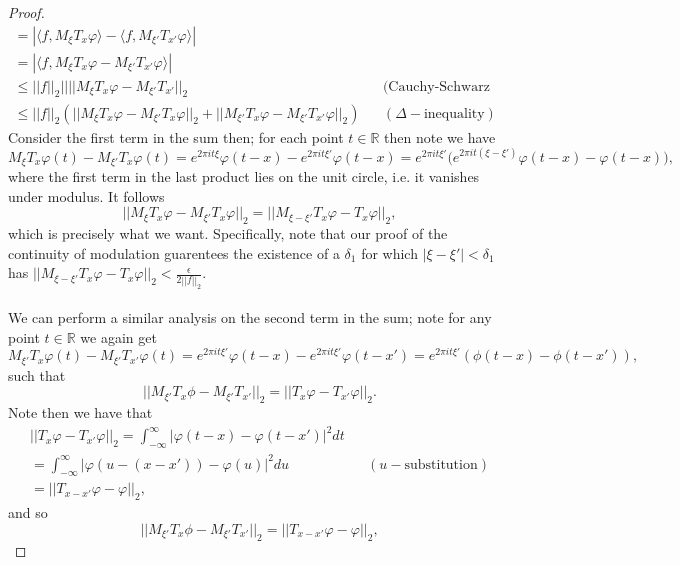 \documentclass[12pt]{article}
\newenvironment{ex}[2][Exercise]{\begin{trivlist}
\item[\hskip \labelsep {\bfseries #1}\hskip \labelsep {\bfseries #2.}]}{\end{trivlist}}
\begin{document}
\begin{ex}{16}
\begin{enumerate}[label=(\alph*)]
\begin{proof}
\begin{align*}
                = |\langle f, M_\xi T_x \varphi \rangle - \langle f, M_{\xi'} T_{x'} \varphi \rangle| \\
                = |\langle f, M_\xi T_x \varphi - M_{\xi'}T_{x'} \varphi \rangle| \\
                \leq ||f||_2||||M_\xi T_x \varphi - M_{\xi'}T_{x'}||_2 && \text{(Cauchy-Schwarz inequality)} \\
                \leq ||f||_2(||M_\xi T_x \varphi - M_{\xi'} T_{x} \varphi||_2 + ||M_{\xi'} T_{x}\varphi - M_{\xi'}T_{x'}\varphi||_2) && (\Delta-\text{inequality})
            \end{align*}
            Consider the first term in the sum then; for each point $t \in \mathbb{R}$ then note we have
            $$M_{\xi}T_{x}\varphi(t) - M_{\xi'}T_{x}\varphi(t) = e^{2\pi it\xi}\varphi(t - x) - e^{2 \pi it\xi'}\varphi(t - x) = e^{2\pi it\xi'} \Big (e^{2\pi i t (\xi - \xi')}\varphi(t - x) - \varphi(t - x) \Big),$$
            where the first term in the last product lies on the unit circle, i.e. it vanishes under modulus. It follows
            $$||M_\xi T_x \varphi - M_{\xi'} T_{x} \varphi||_2 = ||M_{\xi - \xi'}T_x\varphi - T_x\varphi||_2,$$
            which is precisely what we want. Specifically, note that our proof of the continuity of modulation guarentees the existence of a $\delta_1$ for which $|\xi - \xi'| < \delta_1$ has $||M_{\xi - \xi'}T_x\varphi - T_x\varphi||_2 < \frac{\epsilon}{2||f||_2}$. \\ \\
            We can perform a similar analysis on the second term in the sum; note for any point $t \in \mathbb{R}$ we again get
            $$M_{\xi'}T_x\varphi(t) - M_{\xi'}T_{x'}\varphi(t) = e^{2\pi it\xi'}\varphi(t - x) - e^{2\pi it\xi'}\varphi(t - x') = e^{2\pi it\xi'}(\phi(t - x) - \phi(t - x')),$$
            such that 
            $$||M_{\xi'}T_x\phi - M_{\xi'}T_{x'}||_2 = ||T_x\varphi - T_{x'}\varphi||_2.$$
            Note then we have that 
            \begin{align*}
                ||T_x\varphi - T_{x'}\varphi||_2 = \int_{-\infty}^\infty |\varphi(t - x) - \varphi(t - x')|^2 dt \\
                = \int_{-\infty}^\infty |\varphi(u - (x - x')) - \varphi(u)|^2 du && (u-\text{substitution}) \\
                = ||T_{x - x'}\varphi - \varphi||_2,
            \end{align*}
            and so 
            $$||M_{\xi'}T_x\phi - M_{\xi'}T_{x'}||_2 = ||T_{x - x'}\varphi - \varphi||_2,$$

\end{proof}
\end{enumerate}
\end{ex}
\end{document}
